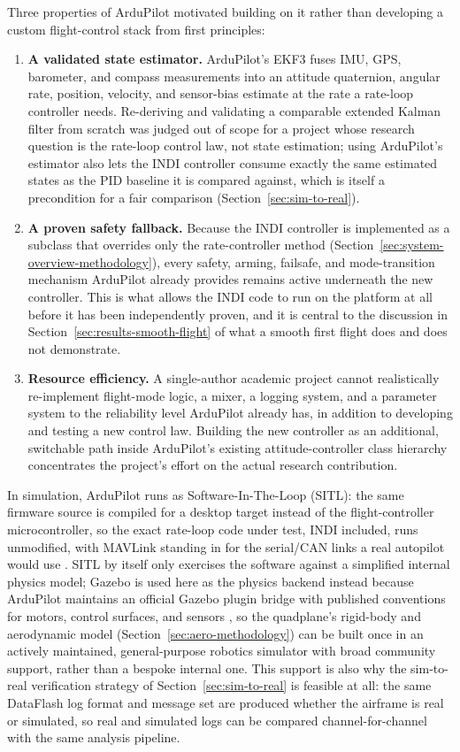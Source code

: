 \documentclass{article}
\begin{document}
Three properties of ArduPilot motivated building on it rather than developing a custom flight-control stack from first principles:
\begin{enumerate}
    \item \textbf{A validated state estimator.} ArduPilot's EKF3 fuses IMU, GPS, barometer, and compass measurements into an attitude quaternion, angular rate, position, velocity, and sensor-bias estimate at the rate a rate-loop controller needs. Re-deriving and validating a comparable extended Kalman filter from scratch was judged out of scope for a project whose research question is the rate-loop control law, not state estimation; using ArduPilot's estimator also lets the INDI controller consume exactly the same estimated states as the PID baseline it is compared against, which is itself a precondition for a fair comparison (Section~\ref{sec:sim-to-real}).
    \item \textbf{A proven safety fallback.} Because the INDI controller is implemented as a subclass that overrides only the rate-controller method (Section~\ref{sec:system-overview-methodology}), every safety, arming, failsafe, and mode-transition mechanism ArduPilot already provides remains active underneath the new controller. This is what allows the INDI code to run on the platform at all before it has been independently proven, and it is central to the discussion in Section~\ref{sec:results-smooth-flight} of what a smooth first flight does and does not demonstrate.
    \item \textbf{Resource efficiency.} A single-author academic project cannot realistically re-implement flight-mode logic, a mixer, a logging system, and a parameter system to the reliability level ArduPilot already has, in addition to developing and testing a new control law. Building the new controller as an additional, switchable path inside ArduPilot's existing attitude-controller class hierarchy concentrates the project's effort on the actual research contribution.
\end{enumerate}

In simulation, ArduPilot runs as Software-In-The-Loop (SITL): the same firmware source is compiled for a desktop target instead of the flight-controller microcontroller, so the exact rate-loop code under test, INDI included, runs unmodified, with MAVLink standing in for the serial/CAN links a real autopilot would use \citep{ardupilotdocs}. SITL by itself only exercises the software against a simplified internal physics model; Gazebo is used here as the physics backend instead because ArduPilot maintains an official Gazebo plugin bridge with published conventions for motors, control surfaces, and sensors \citep{ardupilotgazebo,gazebodocs}, so the quadplane's rigid-body and aerodynamic model (Section~\ref{sec:aero-methodology}) can be built once in an actively maintained, general-purpose robotics simulator with broad community support, rather than a bespoke internal one. This support is also why the sim-to-real verification strategy of Section~\ref{sec:sim-to-real} is feasible at all: the same DataFlash log format and message set are produced whether the airframe is real or simulated, so real and simulated logs can be compared channel-for-channel with the same analysis pipeline.
\end{document}
